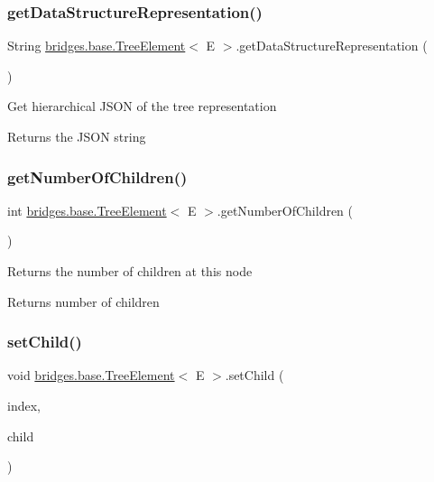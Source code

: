 \subsubsection{\texorpdfstring{get\+Data\+Structure\+Representation()}{getDataStructureRepresentation()}}
{\footnotesize\ttfamily String \hyperlink{classbridges_1_1base_1_1_tree_element}{bridges.\+base.\+Tree\+Element}$<$ E $>$.get\+Data\+Structure\+Representation (\begin{DoxyParamCaption}{ }\end{DoxyParamCaption})}

Get hierarchical J\+S\+ON of the tree representation

\begin{DoxyReturn}{Returns}
the J\+S\+ON string 
\end{DoxyReturn}
\mbox{\label{classbridges_1_1base_1_1_tree_element_a3722c7cec66ff297f999870df0da3cff}} 
\subsubsection{\texorpdfstring{get\+Number\+Of\+Children()}{getNumberOfChildren()}}
{\footnotesize\ttfamily int \hyperlink{classbridges_1_1base_1_1_tree_element}{bridges.\+base.\+Tree\+Element}$<$ E $>$.get\+Number\+Of\+Children (\begin{DoxyParamCaption}{ }\end{DoxyParamCaption})}

Returns the number of children at this node

\begin{DoxyReturn}{Returns}
number of children 
\end{DoxyReturn}
\mbox{\label{classbridges_1_1base_1_1_tree_element_aefafebb19d64398d150e464e4361ddf0}} 
\subsubsection{\texorpdfstring{set\+Child()}{setChild()}}
{\footnotesize\ttfamily void \hyperlink{classbridges_1_1base_1_1_tree_element}{bridges.\+base.\+Tree\+Element}$<$ E $>$.set\+Child (\begin{DoxyParamCaption}\item[{int}]{index,  }\item[{\hyperlink{classbridges_1_1base_1_1_tree_element}{Tree\+Element}$<$ E $>$}]{child }\end{DoxyParamCaption})}

